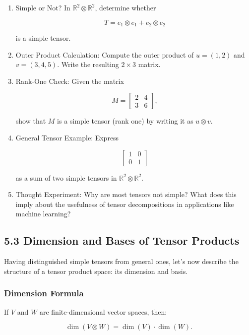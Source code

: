 \documentclass[
  letterpaper,
  DIV=11,
  numbers=noendperiod]{scrreprt}
\begin{document}
\begin{enumerate}
\def\labelenumi{\arabic{enumi}.}
\item
  Simple or Not? In \(\mathbb{R}^2 \otimes \mathbb{R}^2\), determine
  whether

  \[
  T = e_1 \otimes e_1 + e_2 \otimes e_2
  \]

  is a simple tensor.
\item
  Outer Product Calculation: Compute the outer product of \(u=(1,2)\)
  and \(v=(3,4,5)\). Write the resulting \(2 \times 3\) matrix.
\item
  Rank-One Check: Given the matrix

  \[
  M = \begin{bmatrix}2 & 4 \\ 3 & 6\end{bmatrix},
  \]

  show that \(M\) is a simple tensor (rank one) by writing it as
  \(u \otimes v\).
\item
  General Tensor Example: Express

  \[
  \begin{bmatrix}1 & 0 \\ 0 & 1\end{bmatrix}
  \]

  as a sum of two simple tensors in
  \(\mathbb{R}^2 \otimes \mathbb{R}^2\).
\item
  Thought Experiment: Why are most tensors not simple? What does this
  imply about the usefulness of tensor decompositions in applications
  like machine learning?
\end{enumerate}

\subsection{5.3 Dimension and Bases of Tensor
Products}\label{dimension-and-bases-of-tensor-products}

Having distinguished simple tensors from general ones, let's now
describe the structure of a tensor product space: its dimension and
basis.

\subsubsection{Dimension Formula}\label{dimension-formula}

If \(V\) and \(W\) are finite-dimensional vector spaces, then:

\[
\dim(V \otimes W) = \dim(V) \cdot \dim(W).
\]
\end{document}
